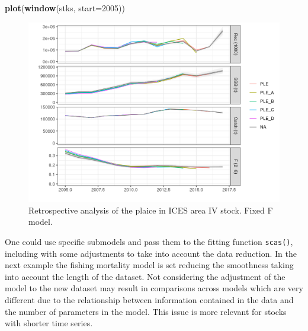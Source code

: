 \documentclass[
]{book}
\newenvironment{Shaded}{\begin{snugshade}}{\end{snugshade}}
\newcommand{\AttributeTok}[1]{\textcolor[rgb]{0.13,0.29,0.53}{#1}}
\newcommand{\DecValTok}[1]{\textcolor[rgb]{0.00,0.00,0.81}{#1}}
\newcommand{\FunctionTok}[1]{\textcolor[rgb]{0.13,0.29,0.53}{\textbf{#1}}}
\newcommand{\NormalTok}[1]{#1}
\begin{document}
\begin{Shaded}
\begin{Highlighting}[]
\FunctionTok{plot}\NormalTok{(}\FunctionTok{window}\NormalTok{(stks, }\AttributeTok{start=}\DecValTok{2005}\NormalTok{))}
\end{Highlighting}
\end{Shaded}

\begin{figure}
\centering
\includegraphics{_bookdown_files/_main_files/figure-html/retro-1.png}
\caption{\label{fig:retro}Retrospective analysis of the plaice in ICES area IV stock. Fixed F model.}
\end{figure}

One could use specific submodels and pass them to the fitting function \texttt{scas()}, including with some adjustments to take into account the data reduction. In the next example the fishing mortality model is set reducing the smoothness taking into account the length of the dataset. Not considering the adjustment of the model to the new dataset may result in comparisons across models which are very different due to the relationship between information contained in the data and the number of parameters in the model. This issue is more relevant for stocks with shorter time series.
\end{document}
